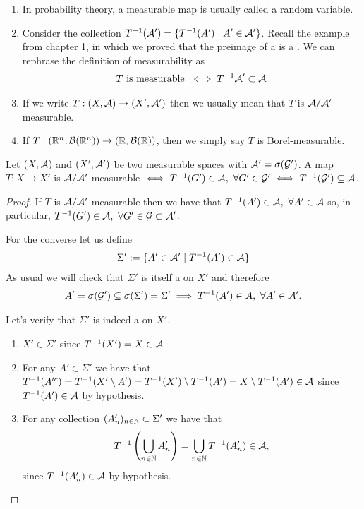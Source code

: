\begin{remark}$ $\newline
	\begin{enumerate}
		\item In probability theory, a measurable map is usually called a random variable.
		\item Consider the collection ${T}^{-1}(\mathcal{A}') = \{{T}^{-1}(A') \mid A' \in \mathcal{A}'\}$. Recall the example from chapter 1, in which we proved that the preimage of a \siga is a \siga. We can rephrase the definition of measurability as
		\begin{align*}
			T \text{ is measurable } \iff {T}^{-1}\mathcal{A}' \subset \mathcal{A}
		\end{align*}
		\item If we write $T: (X, \mathcal{A}) \to (X', \mathcal{A}')$ then we usually mean that $T$ is $\mathcal{A}/\mathcal{A}'$-measurable.
		
		\item If $T: (\mathbb{R}^n, \mathcal{B}(\mathbb{R}^n)) \to (\mathbb{R}, \mathcal{B}(\mathbb{R}))$, then we simply say $T$ is Borel-measurable.
	\end{enumerate}
\end{remark}

\begin{lem}
	\label{lem:measurable-generators}
	Let $(X, \mathcal{A})$ and $(X', \mathcal{A}')$ be two measurable spaces with $\mathcal{A}' = \sigma(\mathcal{G}')$. A map $T: X \to X'$ is $\mathcal{A}/\mathcal{A}'$-measurable $\iff {T}^{-1}(G') \in \mathcal{A},\ \forall G' \in \mathcal{G}' \iff {T}^{-1}(\mathcal{G}') \subseteq \mathcal{A}$.
\end{lem}

\begin{proof}
	If $T$ is $\mathcal{A}/\mathcal{A}'$ measurable then we have that ${T}^{-1}(A') \in \mathcal{A},\ \forall A' \in \mathcal{A}$ so, in particular, ${T}^{-1}(G') \in \mathcal{A},\ \forall G' \in \mathcal{G} \subset \mathcal{A}'$.
	
	For the converse let us define
	\begin{align*}
		\Sigma' := \{ A' \in \mathcal{A}' \mid {T}^{-1}(A') \in \mathcal{A} \}
	\end{align*}
	As usual we will check that $\Sigma'$ is itself a \siga on $X'$ and therefore
	\begin{align*}
		A' = \sigma(\mathcal{G}') \subseteq \sigma(\Sigma') = \Sigma' \implies {T}^{-1}(A') \in A,\ \forall A' \in \mathcal{A}'.
	\end{align*}
	
	Let's verify that $\Sigma'$ is indeed a \siga on $X'$.
	\begin{enumerate}
		\item $X' \in \Sigma'$ since ${T}^{-1}(X') = X \in \mathcal{A}$
		\item For any $A' \in \Sigma'$ we have that ${T}^{-1}(A'^c) = {T}^{-1}(X' \setminus A') = {T}^{-1}(X') \setminus {T}^{-1}(A') = X \setminus {T}^{-1}(A') \in \mathcal{A}$ since ${T}^{-1}(A') \in \mathcal{A}$ by hypothesis.
		\item For any collection $(A'_n)_{n\in\mathbb{N}} \subset \Sigma'$ we have that
		\begin{align*}
			{T}^{-1}\left(\bigcup_{n\in\mathbb{N}} A'_n\right) = \bigcup_{n\in\mathbb{N}} {T}^{-1}(A_n') \in \mathcal{A},
		\end{align*}
		since ${T}^{-1}(A_n') \in \mathcal{A}$ by hypothesis.
	\end{enumerate}
\end{proof}

